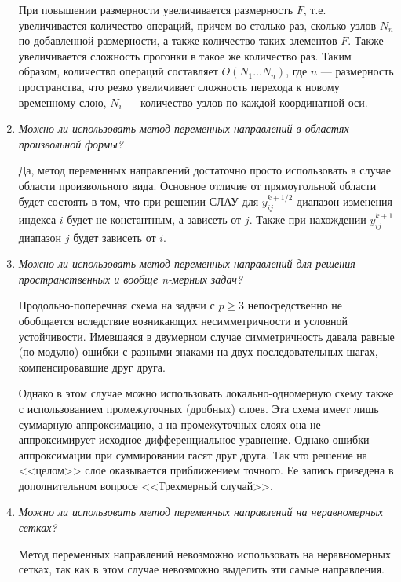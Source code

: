 \documentclass[12pt, a4paper]{article}
\begin{document}
\begin{enumerate}
		При повышении размерности увеличивается размерность $F$, т.е. увеличивается количество операций, причем во столько раз, сколько узлов $N_n$ по добавленной размерности, а также количество таких элементов $F$. Также увеличивается сложность прогонки в такое же количество раз. Таким образом, количество операций составляет $O(N_1 \dots N_n)$, где $n$ --- размерность пространства, что резко увеличивает сложность перехода к новому временному слою, $N_i$ --- количество узлов по каждой координатной оси.
		
		\item \textit{Можно ли использовать метод переменных направлений в областях произвольной формы?}
		\smallskip
		
		Да, метод переменных направлений достаточно просто использовать в случае области произвольного вида. Основное отличие от прямоугольной области будет состоять в том, что при решении СЛАУ для $y^{k+1/2}_{ij}$ диапазон изменения индекса $i$ будет не константным, а зависеть от $j$. Также при нахождении $y^{k+1}_{ij}$ диапазон $j$ будет зависеть от $i$.
		
		
		\item \textit{Можно ли использовать метод переменных направлений для решения пространственных и вообще n-мерных задач?}
		\smallskip
		
		Продольно-поперечная схема на задачи с $p \ge 3$ непосредственно не обобщается вследствие возникающих несимметричности и условной устойчивости. Имевшаяся в двумерном случае симметричность давала равные (по модулю) ошибки с разными знаками на двух последовательных шагах, компенсировавшие друг друга.
		
		Однако в этом случае можно использовать локально-одномерную схему также с использованием промежуточных (дробных) слоев. Эта схема имеет лишь суммарную аппроксимацию, а на промежуточных слоях она не аппроксимирует исходное дифференциальное уравнение. Однако ошибки аппроксимации при суммировании гасят друг друга. Так что решение на <<целом>> слое оказывается приближением точного. Ее запись приведена в дополнительном вопросе <<Трехмерный случай>>.
		
		\item \textit{Можно ли использовать метод переменных направлений на неравномерных сетках?}
		\smallskip
		
		Метод переменных направлений невозможно использовать на неравномерных сетках, так как в этом случае невозможно выделить эти самые направления.
		
		
	\end{enumerate}
	\newpage
	
\end{document}
